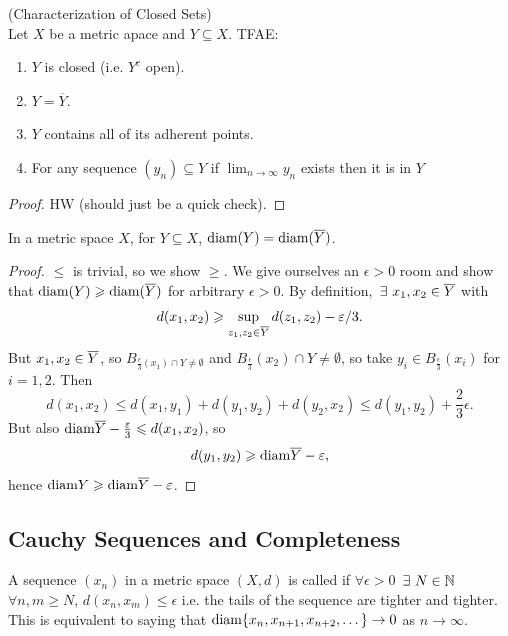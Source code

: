 \documentclass[14pt,oneside]{extarticle}
\begin{document}
\begin{corollary*} (Characterization of Closed Sets)\\
  Let $X$ be a metric apace and $Y \subseteq X$. TFAE:
  \begin{enumerate}[nosep]
    \item $Y$ is closed (i.e. $Y^c$ open).
    \item $Y = \overline{Y}$.
    \item $Y$ contains all of its adherent points.
    \item For any sequence $(y_n) \subseteq Y$ if $\lim_{n \to \infty} y_n$ exists then it is in $Y$
  \end{enumerate}
\end{corollary*}
\begin{proof}
  HW (should just be a quick check).
\end{proof}

\begin{corollary*}
  In a metric space $X$, for $Y \subseteq X$, $\text{diam}(Y) = \text{diam}(\overline{Y})$.
\end{corollary*}
\begin{proof}
  $\leq$ is trivial, so we show $\geq$. We give ourselves an $\epsilon > 0$ room and show that $\text{diam}(Y) \geqslant \text{diam}(\overline{Y})$ for arbitrary $\epsilon > 0$. By definition, $\exists \, x_1, x_2 \in \clo{Y}$ with 
  \[d(x_1, x_2) \geqslant \sup_{z_1, z_2 \in \overline{Y}}d(z_1, z_2) - \varepsilon/3.\]
  But $x_1, x_2 \in \overline{Y}$, so $B_{\frac{\epsilon}{3}(x_1) \cap Y \neq \emptyset}$ and $B_{\frac{\epsilon}{3}}(x_2) \cap Y \neq \emptyset$, so take $y_i \in B_{\frac{\epsilon}{3}}(x_i)$ for $i = 1, 2$. Then 
  \[d(x_1, x_2) \leq d(x_1, y_1) + d(y_1, y_2) + d(y_2, x_2) \leq d(y_1, y_2) + \frac{2}{3} \epsilon.\]
  But also $\text{diam}{\overline{Y}} - \frac{\varepsilon}{3} \leqslant d(x_1,x_2)$, so 
  \[d(y_1,y_2) \geqslant \text{diam}{\overline{Y}} - \varepsilon, \]
  hence $\text{diam}{Y} \geqslant \text{diam}{\overline{Y}} - \varepsilon$.
\end{proof}

\subsection{Cauchy Sequences and Completeness}
\begin{definition*}
  A sequence $(x_n)$ in a metric space $(X,d)$ is called  if $\forall \epsilon > 0$ $\exists \, N \in \N$ $\forall n,m \geq N$, $d(x_n, x_m) \leq \epsilon$ i.e. the tails of the sequence are tighter and tighter. This is equivalent to saying that $\text{diam}{\{x_n, x_{n+1}, x_{n+2}, \dots\}} \to 0$ as $n\to \infty$.
\end{definition*}
\end{document}
